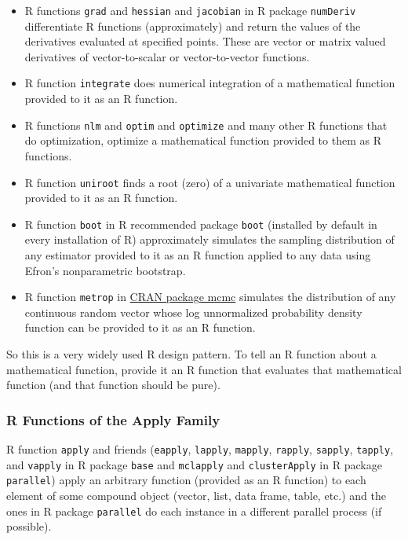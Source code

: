 \documentclass[
]{article}
\begin{document}
\begin{itemize}
\item
  R functions \texttt{grad} and \texttt{hessian} and \texttt{jacobian}
  in R package \texttt{numDeriv} differentiate R functions
  (approximately) and return the values of the derivatives evaluated at
  specified points. These are vector or matrix valued derivatives of
  vector-to-scalar or vector-to-vector functions.
\item
  R function \texttt{integrate} does numerical integration of a
  mathematical function provided to it as an R function.
\item
  R functions \texttt{nlm} and \texttt{optim} and \texttt{optimize} and
  many other R functions that do optimization, optimize a mathematical
  function provided to them as R functions.
\item
  R function \texttt{uniroot} finds a root (zero) of a univariate
  mathematical function provided to it as an R function.
\item
  R function \texttt{boot} in R recommended package \texttt{boot}
  (installed by default in every installation of R) approximately
  simulates the sampling distribution of any estimator provided to it as
  an R function applied to any data using Efron's nonparametric
  bootstrap.
\item
  R function \texttt{metrop} in
  \href{https://cloud.r-project.org/package=mcmc}{CRAN package mcmc}
  simulates the distribution of any continuous random vector whose log
  unnormalized probability density function can be provided to it as an
  R function.
\end{itemize}

So this is a very widely used R design pattern. To tell an R function
about a mathematical function, provide it an R function that evaluates
that mathematical function (and that function should be pure).

\hypertarget{r-functions-of-the-apply-family}{%
\subsubsection{R Functions of the Apply
Family}\label{r-functions-of-the-apply-family}}

R function \texttt{apply} and friends (\texttt{eapply}, \texttt{lapply},
\texttt{mapply}, \texttt{rapply}, \texttt{sapply}, \texttt{tapply}, and
\texttt{vapply} in R package \texttt{base} and \texttt{mclapply} and
\texttt{clusterApply} in R package \texttt{parallel}) apply an arbitrary
function (provided as an R function) to each element of some compound
object (vector, list, data frame, table, etc.) and the ones in R package
\texttt{parallel} do each instance in a different parallel process (if
possible).
\end{document}
